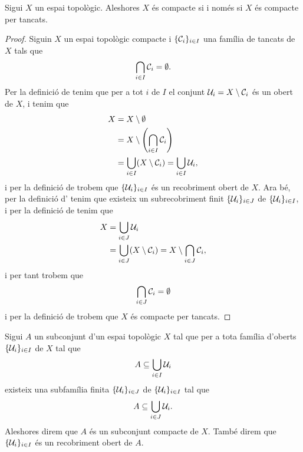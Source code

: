 \documentclass[../Apunts.tex]{subfiles}
\begin{document}
	\begin{proposition}
		\label{prop:compacte si i només si compacte per tancats}
		\label{prop:equivalència entre compacitat i compacitat per tancats}
		Sigui \(X\) un espai topològic. Aleshores \(X\) és compacte si i només si \(X\) és compacte per tancats.
		\begin{proof}
			Siguin \(X\) un espai topològic compacte i \(\{\mathcal{C}_{i}\}_{i\in I}\) una família de tancats de \(X\) tals que
			\[\bigcap_{i\in I}\mathcal{C}_{i}=\emptyset.\]
			Per la definició de  tenim que per a tot \(i\) de \(I\) el conjunt \(\mathcal{U}_{i}=X\setminus\mathcal{C}_{i}\) és un obert de \(X\), i tenim que
			\begin{align*}
				X&=X\setminus\emptyset \\
				&=X\setminus\left(\bigcap_{i\in I}\tancat{C}_{i}\right) \\
				&=\bigcup_{i\in I}(X\setminus\tancat{C}_{i})=\bigcup_{i\in I}\obert{U}_{i},
			\end{align*}
			i per la definició de  trobem que \(\{\mathcal{U}_{i}\}_{i\in I}\) és un recobriment obert de \(X\). Ara bé, per la definició d' tenim que existeix un subrecobriment finit \(\{\mathcal{U}_{i}\}_{i\in J}\) de \(\{\mathcal{U}_{i}\}_{i\in I}\), i per la definició de  tenim que
			\begin{align*}
				X&=\bigcup_{i\in J}\mathcal{U}_{i} \\
				&=\bigcup_{i\in J}(X\setminus\mathcal{C}_{i})=X\setminus\bigcap_{i\in J}\mathcal{C}_{i},
			\end{align*} %
			i per tant trobem que
			\[\bigcap_{i\in J}\mathcal{C}_{i}=\emptyset\]
			i per la definició de  trobem que \(X\) és compacte per tancats.
		\end{proof}
	\end{proposition}
	\begin{definition}
		\label{def:compacitat d'un subconjunt}
		\label{def:subconjunt compacte}
		\label{def:recobriment obert d'un subconjunt}
		Sigui \(A\) un subconjunt d'un espai topològic \(X\) tal que per a tota família d'oberts \(\{\mathcal{U}_{i}\}_{i\in I}\) de \(X\) tal que
		\[A\subseteq\bigcup_{i\in I}\mathcal{U}_{i}\]
		existeix una subfamília finita \(\{\mathcal{U}_{i}\}_{i\in J}\) de \(\{\mathcal{U}_{i}\}_{i\in I}\) tal que
		\[A\subseteq\bigcup_{i\in J}\mathcal{U}_{i}.\]
		Aleshores direm que \(A\) és un subconjunt compacte de \(X\). També direm que \(\{\mathcal{U}_{i}\}_{i\in I}\) és un recobriment obert de \(A\).
	\end{definition}
\end{document}
